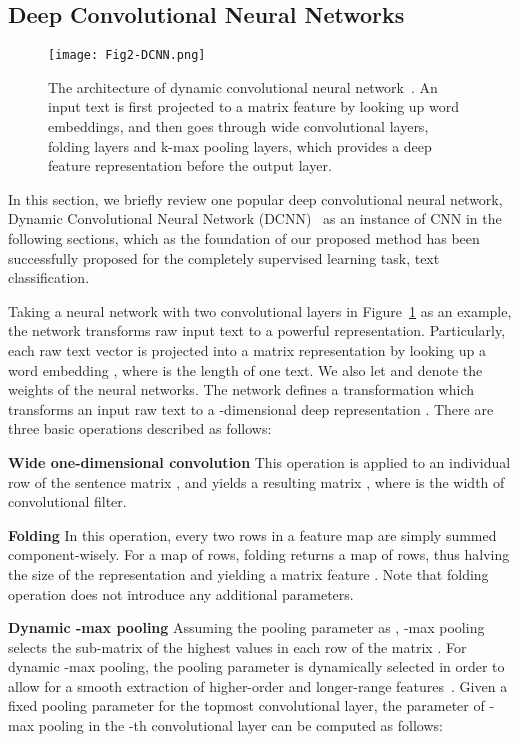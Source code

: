 \documentclass[review]{elsarticle}
\begin{document}
\subsection{Deep Convolutional Neural Networks}


\begin{figure}[t]
\begin{center}
\texttt{[image: Fig2-DCNN.png]}
\caption{The architecture of dynamic convolutional neural network~\cite{16_blunsom2014convolutional}. An input text is first projected to a matrix feature by looking up word embeddings, and then goes through wide convolutional layers, folding layers and k-max pooling layers, which provides a deep feature representation before the output layer.}\label{fig:DCNN}
\end{center}
\end{figure}



In this section, we briefly review one popular deep convolutional neural network, Dynamic Convolutional Neural Network (DCNN)~\cite{16_blunsom2014convolutional} as an instance of CNN in the following sections, which as the foundation of our proposed method has been successfully proposed for the completely supervised learning task, text classification.

Taking a neural network with two convolutional layers in Figure~\ref{fig:DCNN} as an example, the network transforms raw input text to a powerful representation. Particularly, each raw text vector  is projected into a matrix representation  by looking up a word embedding , where  is the length of one text. We also let  and  denote the weights of the neural networks. The network defines a transformation   which transforms an input raw text  to a -dimensional deep representation . There are three basic operations described as follows:

 {\bf{Wide one-dimensional convolution}} This operation  is applied to an individual row of the sentence matrix , and yields a resulting matrix , where  is the width of convolutional filter.


 {\bf{Folding}}  In this operation, every two rows in a feature map are simply summed component-wisely. For a map of  rows, folding returns a map of  rows, thus halving the size of the representation and yielding a matrix feature . Note that folding operation does not introduce any additional parameters.

{\bf{Dynamic -max pooling}} Assuming the pooling parameter as , -max pooling selects the sub-matrix  of the  highest values in each row of the matrix . For dynamic -max pooling, the pooling parameter  is dynamically selected in order to allow for a smooth extraction of higher-order and longer-range features~\cite{16_blunsom2014convolutional}. Given a fixed pooling parameter  for the topmost convolutional layer, the parameter  of -max pooling in the -th convolutional layer can be computed as follows:
\end{document}
